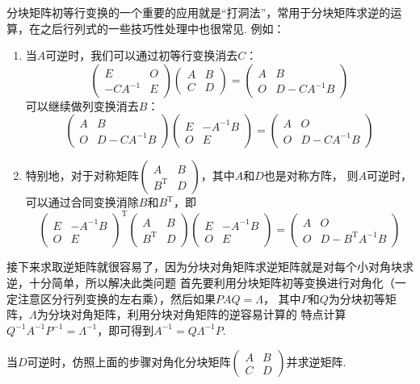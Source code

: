 分块矩阵初等行变换的一个重要的应用就是``打洞法''，常用于分块矩阵求逆的运算，在之后行列式的一些技巧性处理中也很常见.
例如：
\begin{enumerate}
    \item 当$A$可逆时，我们可以通过初等行变换消去$C$：
    \[ \begin{pmatrix}
        E & O \\ -CA^{-1} & E
    \end{pmatrix}\begin{pmatrix}
        A & B \\ C & D
    \end{pmatrix}=\begin{pmatrix}
        A & B \\ O & D-CA^{-1}B
    \end{pmatrix} \]
    可以继续做列变换消去$B$：
    \[ \begin{pmatrix}
        A & B \\ O & D-CA^{-1}B
    \end{pmatrix}\begin{pmatrix}
        E & -A^{-1}B \\ O & E
    \end{pmatrix}=\begin{pmatrix}
        A & O \\ O & D-CA^{-1}B
    \end{pmatrix} \]
    \item 特别地，对于对称矩阵$\begin{pmatrix}A & B \\ B^\mathrm{T} & D\end{pmatrix}$，其中$A$和$D$也是对称方阵，
    则$A$可逆时，可以通过合同变换消除$B$和$B^\mathrm{T}$，即
    \[ \begin{pmatrix}
        E & -A^{-1}B \\ O & E
    \end{pmatrix}^\mathrm{T}\begin{pmatrix}
        A & B \\ B^\mathrm{T} & D
    \end{pmatrix}\begin{pmatrix}
        E & -A^{-1}B \\ O & E
    \end{pmatrix}=\begin{pmatrix}
        A & O \\ O & D-B^\mathrm{T}A^{-1}B
    \end{pmatrix} \]
\end{enumerate}
接下来求取逆矩阵就很容易了，因为分块对角矩阵求逆矩阵就是对每个小对角块求逆，十分简单，所以解决此类问题
首先要利用分块矩阵初等变换进行对角化（一定注意区分行列变换的左右乘），然后如果$PAQ=\Lambda$，
其中$P$和$Q$为分块初等矩阵，$\Lambda$为分块对角矩阵，利用分块对角矩阵的逆容易计算的
特点计算$Q^{-1}A^{-1}P^{-1}=\Lambda^{-1}$，即可得到$A^{-1}=Q\Lambda^{-1}P$.
\begin{example}
    当$D$可逆时，仿照上面的步骤对角化分块矩阵$\begin{pmatrix}A & B \\ C & D\end{pmatrix}$并求逆矩阵.
\end{example}

